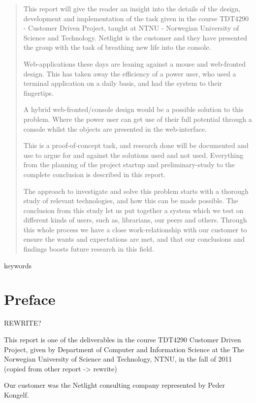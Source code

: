 \documentclass[10pt,a4paper,oneside]{report}
\begin{document}
\begin{abstract}
This report will give the reader an insight into the details of the design, development and implementation of the task given in the course TDT4290 - Customer Driven Project, taught at NTNU - Norwegian University of Science and Technology. Netlight is the customer and they have presented the group with the task of breathing new life into the console.

Web-applications these days are leaning against a mouse and web-fronted design. This has taken away the efficiency of a power user, who used a terminal application on a daily basis, and had the system to their fingertips.

A hybrid web-fronted/console design would be a possible solution to this problem. Where the power user can get use of their full potential through a console whilst the objects are presented in the web-interface. 

This is a proof-of-concept task, and research done will be documented and use to argue for and against the solutions used and not used. Everything from the planning of the project startup and preliminary-study to the complete conclusion is described in this report. 

The approach to investigate and solve this problem starts with a thorough study of relevant technologies, and how this can be made possible. The conclusion from this study let us put together a system which we test on different kinds of users, such as, librarians, our peers and others. Through this whole process we have a close work-relationship with our customer to ensure the wants and expectations are met, and that our conclusions and findings boosts future research in this field. 

\end{abstract}

keywords


\chapter*{Preface}
REWRITE?

This report is one of the deliverables in the course TDT4290 Customer
Driven Project, given by Department of Computer and Information Science
at the The Norwegian University of Science and Technology, NTNU, in the
fall of 2011 (copied from other report -> rewrite)

Our customer was the Netlight consulting company represented by Peder Kongelf.
\end{document}
